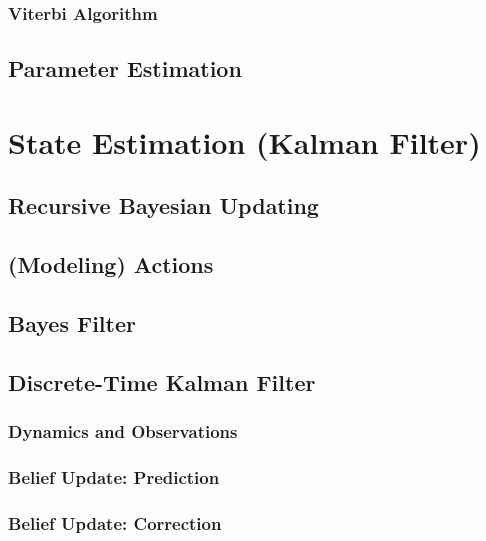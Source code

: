 			\subsubsection{Viterbi Algorithm} %

		\subsection{Parameter Estimation} %

	\section{State Estimation (Kalman Filter)} %

		\subsection{Recursive Bayesian Updating} %

		\subsection{(Modeling) Actions} %

		\subsection{Bayes Filter} %

		\subsection{Discrete-Time Kalman Filter} %

			\subsubsection{Dynamics and Observations} %

			\subsubsection{Belief Update: Prediction} %

			\subsubsection{Belief Update: Correction} %

